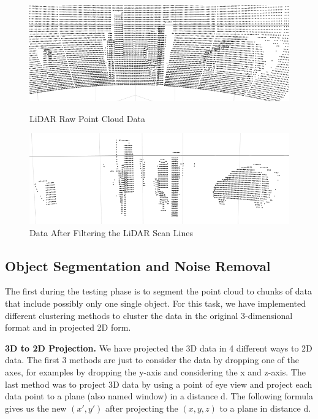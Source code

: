 \begin{figure}[!h]
\centering
\begin{minipage}{0.49\textwidth}
  \centering
        \includegraphics[width=.9\linewidth]{images/ground_before2.png}
        \caption{LiDAR Raw Point Cloud Data}
        \label{fig:ground_before}
\end{minipage}%
\begin{minipage}{0.49\textwidth}
  \centering
        \includegraphics[width=.9\linewidth]{images/ground_after2.png}
        \caption{Data After Filtering the LiDAR Scan Lines}
        \label{fig:after}
\end{minipage}%
\end{figure}





\subsection{Object Segmentation and Noise Removal}
The first during the testing phase is to segment the point cloud to chunks of data that include possibly only one single object.
For this task, we have implemented different clustering methods to cluster the data in the original 3-dimensional format and in projected 2D form.



\textbf{3D to 2D Projection.} We have projected the 3D data in 4 different ways to 2D data. The first 3 methods are just to consider the data by dropping one of the axes, for examples by dropping the y-axis and considering the x and z-axis.  The last method was to project 3D data by using a point of eye view and project each data point to a plane (also named window) in a distance d.  The following formula gives us the new $(x',  y')$ after projecting the $(x,y,z)$ to a plane in distance d.

